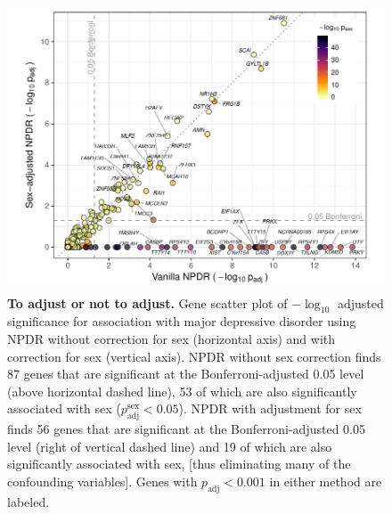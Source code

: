 \documentclass[10pt]{article}
\begin{document}
\begin{figure}[!tpb]%
\centerline{\includegraphics[]{../figs/mostafavi_npdrs_mdd.pdf}}
\caption{{\bf To adjust or not to adjust.}
Gene scatter plot of $-\log_{10}$ adjusted significance for association with major depressive disorder using NPDR without correction for sex (horizontal axis) and with correction for sex (vertical axis). NPDR without sex correction finds 87 genes that are significant at the Bonferroni-adjusted 0.05 level (above horizontal dashed line), 53 of which are also significantly associated with sex ($p^\textrm{sex}_\textrm{adj} < 0.05$).  NPDR with adjustment for sex finds 56 genes that are significant at the Bonferroni-adjusted 0.05 level (right of vertical dashed line) and 19 of which are also significantly associated with sex, [thus eliminating many of the confounding variables]. Genes with $p_\textrm{adj} < 0.001$ in either method are labeled.}
\label{fig:npdrs_mdd}
\end{figure}
\end{document}
